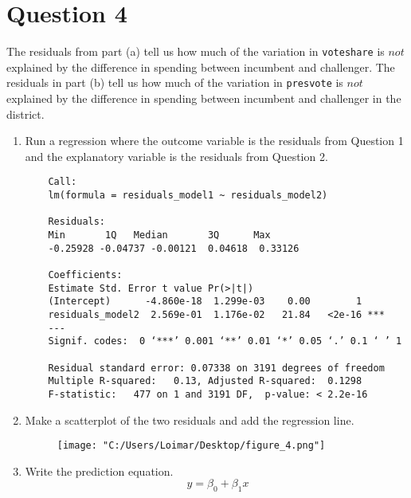 \documentclass[12pt,letterpaper]{article}
\begin{document}
\section*{Question 4}
\noindent The residuals from part (a) tell us how much of the variation in \texttt{voteshare} is $not$ explained by the difference in spending between incumbent and challenger. The residuals in part (b) tell us how much of the variation in \texttt{presvote} is $not$ explained by the difference in spending between incumbent and challenger in the district.
	\begin{enumerate}
		\item Run a regression where the outcome variable is the residuals from Question 1 and the explanatory variable is the residuals from Question 2.	
			 
		\begin{BVerbatim}
	Call:
	lm(formula = residuals_model1 ~ residuals_model2)
	
	Residuals:
	Min       1Q   Median       3Q      Max 
	-0.25928 -0.04737 -0.00121  0.04618  0.33126 
	
	Coefficients:
	Estimate Std. Error t value Pr(>|t|)    
	(Intercept)      -4.860e-18  1.299e-03    0.00        1    
	residuals_model2  2.569e-01  1.176e-02   21.84   <2e-16 ***
	---
	Signif. codes:  0 ‘***’ 0.001 ‘**’ 0.01 ‘*’ 0.05 ‘.’ 0.1 ‘ ’ 1
	
	Residual standard error: 0.07338 on 3191 degrees of freedom
	Multiple R-squared:   0.13,	Adjusted R-squared:  0.1298 
	F-statistic:   477 on 1 and 3191 DF,  p-value: < 2.2e-16
		\end{BVerbatim}
		\vspace{6cm}
		\item Make a scatterplot of the two residuals and add the regression line. 
		 
			\begin{figure}[h!]
			\centering
			\texttt{[image: "C:/Users/Loimar/Desktop/figure\_4.png"]}
			\label{fig:figure_4}
		\end{figure}
			\vspace{6cm}
		\item Write the prediction equation.
		\begin{equation}
			\ y = \beta_0 + \beta_1 x
		\end{equation}
	\end{enumerate}
	
\end{document}
